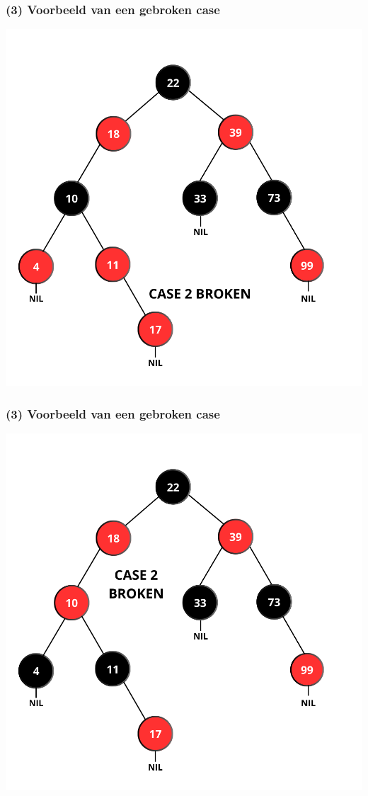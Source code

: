 \documentclass[aspectratio=169,sidebar,dyslexic]{uva-inf-presentation}
\begin{document}
\begin{frame}
\frametitle{(3) Voorbeeld van een gebroken case}
    \includegraphics[scale=.30]{CASE2_1.png}
\end{frame}

\begin{frame}
\frametitle{(3) Voorbeeld van een gebroken case}
    \includegraphics[scale=.30]{CASE2_2.png}
\end{frame}
\end{document}
